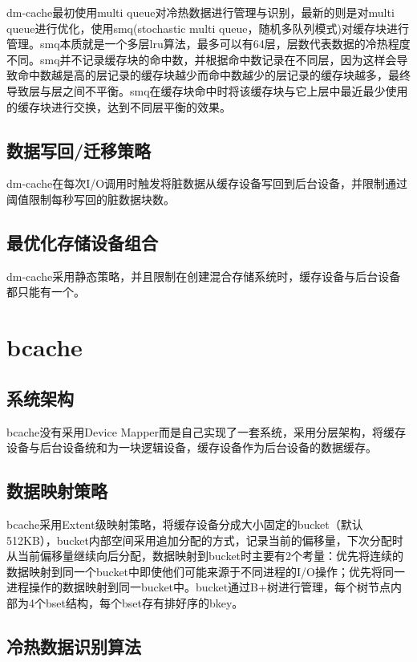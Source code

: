 dm-cache最初使用multi queue对冷热数据进行管理与识别，最新的则是对multi queue进行优化，使用smq(stochastic multi queue，随机多队列模式)对缓存块进行管理。smq本质就是一个多层lru算法，最多可以有64层，层数代表数据的冷热程度不同。smq并不记录缓存块的命中数，并根据命中数记录在不同层，因为这样会导致命中数越是高的层记录的缓存块越少而命中数越少的层记录的缓存块越多，最终导致层与层之间不平衡。smq在缓存块命中时将该缓存块与它上层中最近最少使用的缓存块进行交换，达到不同层平衡的效果。

\subsection{数据写回/迁移策略}

dm-cache在每次I/O调用时触发将脏数据从缓存设备写回到后台设备，并限制通过阈值限制每秒写回的脏数据块数。

\subsection{最优化存储设备组合}

dm-cache采用静态策略，并且限制在创建混合存储系统时，缓存设备与后台设备都只能有一个。

\section{bcache}

\subsection{系统架构}

bcache没有采用Device Mapper而是自己实现了一套系统，采用分层架构，将缓存设备与后台设备统和为一块逻辑设备，缓存设备作为后台设备的数据缓存\cite{stearns2010bcache}。

\subsection{数据映射策略}

bcache采用Extent级映射策略，将缓存设备分成大小固定的bucket（默认512KB），bucket内部空间采用追加分配的方式，记录当前的偏移量，下次分配时从当前偏移量继续向后分配，数据映射到bucket时主要有2个考量：优先将连续的数据映射到同一个bucket中即使他们可能来源于不同进程的I/O操作；优先将同一进程操作的数据映射到同一bucket中。bucket通过B+树进行管理，每个树节点内部为4个bset结构，每个bset存有排好序的bkey。

\subsection{冷热数据识别算法}

